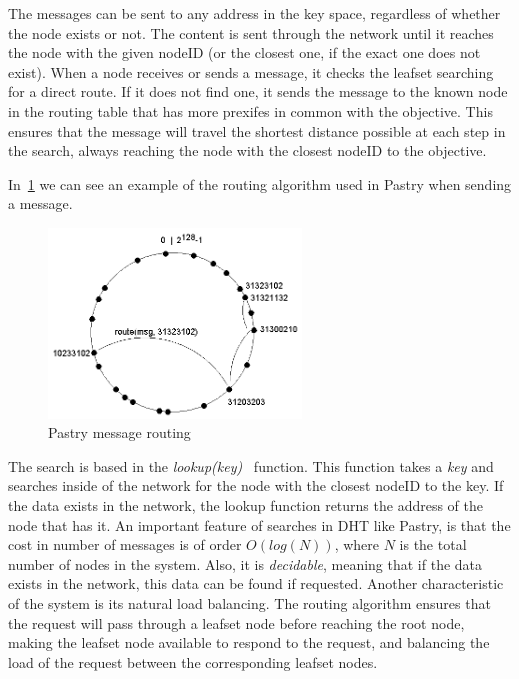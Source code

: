 The messages can be sent to any address in the key space, regardless of whether
the node exists or not. The content is sent through the network until it
reaches the node with the given nodeID (or the closest one, if the exact one does
not exist). When a node receives or sends a message, it checks the leafset
searching for a direct route. If it does not find one, it sends the message to
the known node in the routing table that has  more prexifes in common with the
objective. This ensures that the message will travel the shortest distance
possible at each step in the search, always reaching the node with the closest nodeID to the objective.

In~\ref{fig:p2p_pastry_routing} we can see an example of the routing algorithm used in Pastry when sending a message.

\begin{figure}
\center
\includegraphics[width=0.6\textwidth]{img/pastryrouting}
\caption{Pastry message routing}
\label{fig:p2p_pastry_routing}
\end{figure}


The search is based in the \textit{lookup(key)}~\cite{BalakrishnanEtAl03} function.
This function takes a \textit{key} and searches inside of the network for the node with
the closest nodeID to the key. If the data exists in the network, the lookup
function returns the address of the node that has it. An important feature of searches in DHT
like Pastry, is that the cost in number of messages is of order $O(log(N))$,
where $N$ is the total number of nodes in the system. Also, it is
\textit{decidable}, meaning that if the data exists in the network, this data
can be found if requested. Another characteristic of the system is its natural
load balancing. The routing algorithm ensures that the request will pass through
a leafset node before reaching the root node, making the leafset node available 
to respond to the request, and balancing the load of the request between the
corresponding leafset nodes.



